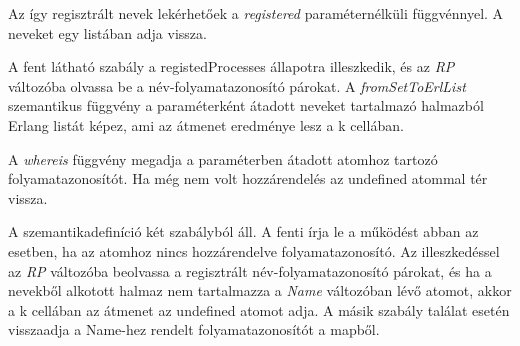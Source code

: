 Az így regisztrált nevek lekérhetőek a \textit{registered} paraméternélküli függvénnyel. A neveket egy listában adja vissza.



A fent látható szabály a registedProcesses állapotra illeszkedik, és az \textit{RP} változóba olvassa be a név-folyamatazonosító párokat. A \textit{fromSetToErlList} szemantikus függvény a paraméterként átadott neveket tartalmazó halmazból Erlang listát képez, ami az átmenet eredménye lesz a k cellában.

A \textit{whereis} függvény megadja a paraméterben átadott atomhoz tartozó folyamatazonosítót. Ha még nem volt hozzárendelés az undefined atommal tér vissza.



A szemantikadefiníció két szabályból áll. A fenti írja le a működést abban az esetben, ha az atomhoz nincs hozzárendelve folyamatazonosító. Az illeszkedéssel az \textit{RP} változóba beolvassa a regisztrált név-folyamatazonosító párokat, és ha a nevekből alkotott halmaz nem tartalmazza a \textit{Name} változóban lévő atomot, akkor a k cellában az átmenet az undefined atomot adja. A másik szabály találat esetén visszaadja a Name-hez rendelt folyamatazonosítót a mapből.





